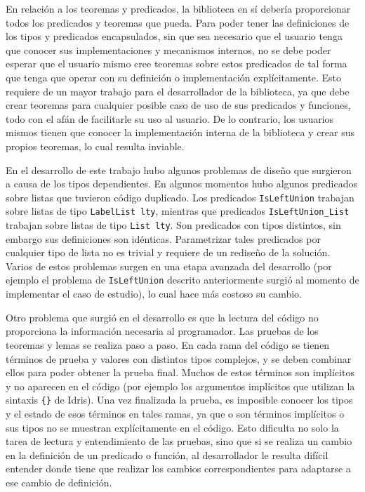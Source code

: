En relación a los teoremas y predicados, la biblioteca en sí debería proporcionar todos los predicados y teoremas que pueda. Para poder tener las definiciones de los tipos y predicados encapsulados, sin que sea necesario que el usuario tenga que conocer sus implementaciones y mecanismos internos, no se debe poder esperar que el usuario mismo cree teoremas sobre estos predicados de tal forma que tenga que operar con su definición o implementación explícitamente. Esto requiere de un mayor trabajo para el desarrollador de la biblioteca, ya que debe crear teoremas para cualquier posible caso de uso de sus predicados y funciones, todo con el afán de facilitarle su uso al usuario. De lo contrario, los usuarios mismos tienen que conocer la implementación interna de la biblioteca y crear sus propios teoremas, lo cual resulta inviable.

En el desarrollo de este trabajo hubo algunos problemas de diseño que surgieron a causa de los tipos dependientes. En algunos momentos hubo algunos predicados sobre listas que tuvieron código duplicado. Los predicados \texttt{IsLeftUnion} trabajan sobre listas de tipo \texttt{LabelList lty}, mientras que predicados \texttt{IsLeftUnion\_List} trabajan sobre listas de tipo \texttt{List lty}. Son predicados con tipos distintos, sin embargo sus definiciones son idénticas. Parametrizar tales predicados por cualquier tipo de lista no es trivial y requiere de un rediseño de la solución. Varios de estos problemas surgen en una etapa avanzada del desarrollo (por ejemplo el problema de \texttt{IsLeftUnion} descrito anteriormente surgió al momento de implementar el caso de estudio), lo cual hace más costoso su cambio.

Otro problema que surgió en el desarrollo es que la lectura del código no proporciona la información necesaria al programador. Las pruebas de los teoremas y lemas se realiza paso a paso. En cada rama del código se tienen términos de prueba y valores con distintos tipos complejos, y se deben combinar ellos para poder obtener la prueba final. Muchos de estos términos son implícitos y no aparecen en el código (por ejemplo los argumentos implícitos que utilizan la sintaxis \texttt{\{\}} de Idris). Una vez finalizada la prueba, es imposible conocer los tipos y el estado de esos términos en tales ramas, ya que o son términos implícitos o sus tipos no se muestran explícitamente en el código. Esto dificulta no solo la tarea de lectura y entendimiento de las pruebas, sino que si se realiza un cambio en la definición de un predicado o función, al desarrollador le resulta difícil entender donde tiene que realizar los cambios correspondientes para adaptarse a ese cambio de definición.

